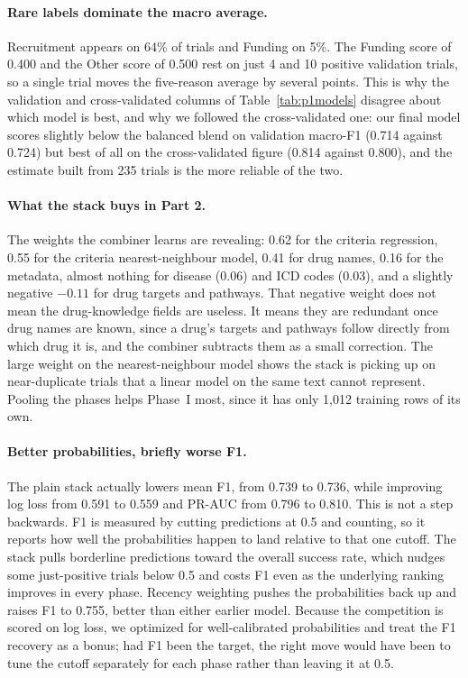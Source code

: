 \paragraph{Rare labels dominate the macro average.}
Recruitment appears on 64\% of trials and Funding on 5\%. The Funding score of
0.400 and the Other score of 0.500 rest on just 4 and 10 positive validation
trials, so a single trial moves the five-reason average by several points. This is
why the validation and cross-validated columns of Table~\ref{tab:p1models}
disagree about which model is best, and why we followed the cross-validated one:
our final model scores slightly below the balanced blend on validation macro-F1
(0.714 against 0.724) but best of all on the cross-validated figure (0.814 against
0.800), and the estimate built from 235 trials is the more reliable of the two.

\paragraph{What the stack buys in Part 2.}
The weights the combiner learns are revealing: 0.62 for the criteria regression,
0.55 for the criteria nearest-neighbour model, 0.41 for drug names, 0.16 for the
metadata, almost nothing for disease (0.06) and ICD codes (0.03), and a slightly
negative $-0.11$ for drug targets and pathways. That negative weight does not mean
the drug-knowledge fields are useless. It means they are redundant once drug names
are known, since a drug's targets and pathways follow directly from which drug it
is, and the combiner subtracts them as a small correction. The large weight on the
nearest-neighbour model shows the stack is picking up on near-duplicate trials
that a linear model on the same text cannot represent. Pooling the phases helps
Phase~I most, since it has only 1,012 training rows of its own.

\paragraph{Better probabilities, briefly worse F1.}
The plain stack actually lowers mean F1, from 0.739 to 0.736, while improving log
loss from 0.591 to 0.559 and PR-AUC from 0.796 to 0.810. This is not a step
backwards. F1 is measured by cutting predictions at 0.5 and counting, so it
reports how well the probabilities happen to land relative to that one cutoff. The
stack pulls borderline predictions toward the overall success rate, which nudges
some just-positive trials below 0.5 and costs F1 even as the underlying ranking
improves in every phase. Recency weighting pushes the probabilities back up and
raises F1 to 0.755, better than either earlier model. Because the competition is
scored on log loss, we optimized for well-calibrated probabilities and treat the
F1 recovery as a bonus; had F1 been the target, the right move would have been to
tune the cutoff separately for each phase rather than leaving it at 0.5.

